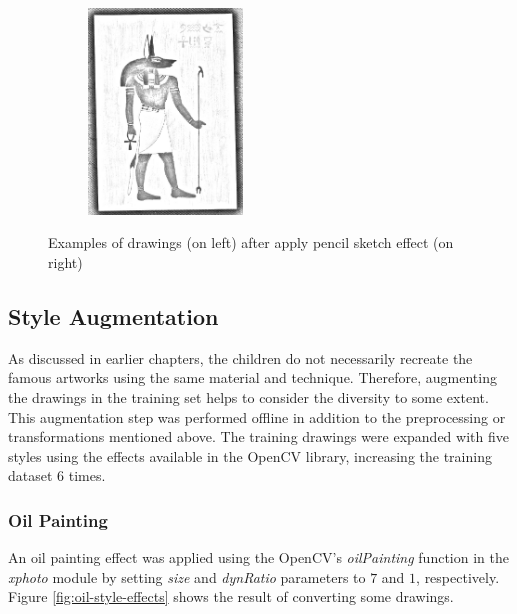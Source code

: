\begin{figure}
\begin{subfigure}[b]{0.5\textwidth}
         \includegraphics[width=0.45\textwidth]{images/style_augments/2019_14-17_0188_RUS_R_C_pencil_gray.jpg}
         \caption{}
     \end{subfigure}
     \caption{Examples of drawings (on left) after apply pencil sketch effect (on right)}
     \label{fig:pencil_gray-style-effects}
\end{figure}


\subsection{Style Augmentation}

As discussed in earlier chapters, the children do not necessarily recreate the famous artworks using the same material and technique. Therefore, augmenting the drawings in the training set helps to consider the diversity to some extent. This augmentation step was performed offline in addition to the preprocessing or transformations mentioned above. The training drawings were expanded with five styles using the effects available in the OpenCV library, increasing the training dataset \begin{math} 6 \end{math} times.
\subsubsection{Oil Painting}

An oil painting effect was applied using the OpenCV's \textit{oilPainting} function in the \textit{xphoto} module by setting \textit{size} and \textit{dynRatio} parameters to \begin{math} 7 \end{math} and \begin{math} 1 \end{math}, respectively. Figure \ref{fig:oil-style-effects} shows the result of converting some drawings.

